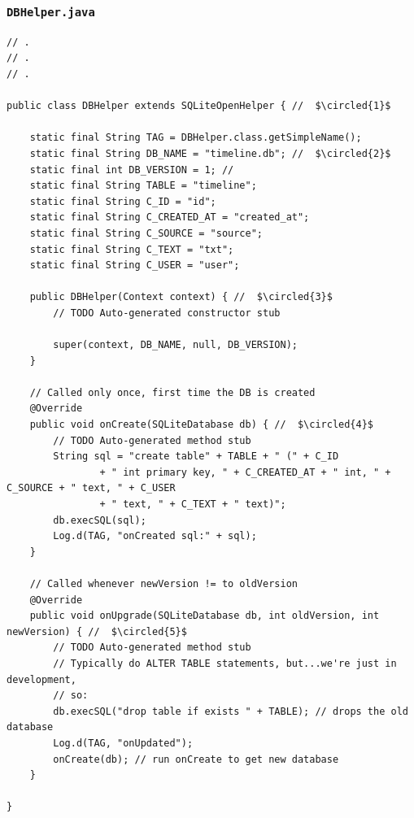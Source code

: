 \begin{frame}
\frametitle{\texttt{DBHelper.java}}

\lstset{language=java, style=eclipse, breaklines=true, tabsize=2}
\begin{lstlisting}[caption=src/com/artemisa/yamba/DBHelper.java, basicstyle=\tiny,escapechar=$]
// .
// .
// .

public class DBHelper extends SQLiteOpenHelper { //  $\circled{1}$

	static final String TAG = DBHelper.class.getSimpleName();
	static final String DB_NAME = "timeline.db"; //  $\circled{2}$
	static final int DB_VERSION = 1; //
	static final String TABLE = "timeline";
	static final String C_ID = "id";
	static final String C_CREATED_AT = "created_at";
	static final String C_SOURCE = "source";
	static final String C_TEXT = "txt";
	static final String C_USER = "user";

	public DBHelper(Context context) { //  $\circled{3}$
		// TODO Auto-generated constructor stub

		super(context, DB_NAME, null, DB_VERSION);
	}

	// Called only once, first time the DB is created
	@Override
	public void onCreate(SQLiteDatabase db) { //  $\circled{4}$
		// TODO Auto-generated method stub
		String sql = "create table" + TABLE + " (" + C_ID
				+ " int primary key, " + C_CREATED_AT + " int, " + C_SOURCE + " text, " + C_USER
				+ " text, " + C_TEXT + " text)";
		db.execSQL(sql);
		Log.d(TAG, "onCreated sql:" + sql);
	}

	// Called whenever newVersion != to oldVersion
	@Override
	public void onUpgrade(SQLiteDatabase db, int oldVersion, int newVersion) { //  $\circled{5}$
		// TODO Auto-generated method stub
		// Typically do ALTER TABLE statements, but...we're just in development,
		// so:
		db.execSQL("drop table if exists " + TABLE); // drops the old database
		Log.d(TAG, "onUpdated");
		onCreate(db); // run onCreate to get new database
	}

}

\end{lstlisting}
\end{frame}
